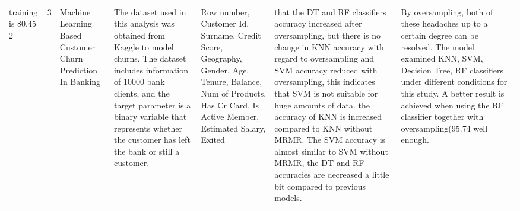 \begin{tabular}{lrlllll}
training is 80.45%
2 & 3 & 
Machine Learning Based Customer Churn Prediction In Banking & The dataset used in this analysis was obtained from Kaggle to model churns. The dataset includes information of 10000 bank clients, and the target parameter is a binary variable that represents whether the customer has left the bank or still a customer. & Row number, Customer Id, Surname, Credit Score, Geography,  Gender, Age, Tenure, Balance, Num of Products, Has Cr Card, Is Active Member, Estimated Salary, Exited & that the DT and RF classifiers accuracy increased after oversampling, but there is no change in KNN accuracy with regard to oversampling and SVM accuracy reduced with oversampling, this indicates that SVM is not suitable for huge amounts of data.  the accuracy of KNN is increased compared to KNN without MRMR. The SVM accuracy is almost similar to SVM without MRMR, the DT and RF accuracies are decreased a little bit compared to previous models. & By oversampling, both of these headaches up to a certain degree can be resolved. The model examined KNN, SVM, Decision Tree, RF classifiers under different conditions for this study. A better result is achieved when using the RF classifier together with oversampling(95.74%
well enough. \\
\end{tabular}

